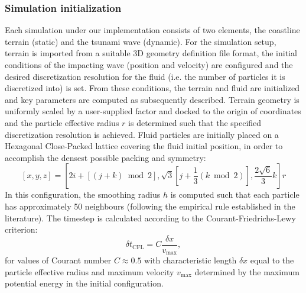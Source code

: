\documentclass{llncs}
\begin{document}
\subsubsection{Simulation initialization} Each simulation under our implementation
consists of two elements, the coastline terrain (static) and the tsunami wave
(dynamic). For the simulation setup, terrain is imported from a suitable 3D geometry
definition file format, the initial conditions of the impacting wave (position and
velocity) are configured and the desired discretization resolution for the fluid (i.e. the
number of particles it is discretized into) is set. From these conditions, the terrain and
fluid are initialized and key parameters are computed as subsequently described. Terrain
geometry is uniformly scaled by a user-supplied factor and docked to the origin of
coordinates and the particle effective radius $r$ is determined such that the specified
discretization resolution is achieved. Fluid particles are initially placed on a Hexagonal
Close-Packed lattice covering the fluid initial position, in order to accomplish the
densest possible packing and symmetry:
\begin{equation}
  \label{eq:hcp}
  [x, y, z] = \left[ 2i+[(j+k) \bmod 2], \sqrt{3}[j + \frac{1}{3} (k \bmod 2)],
    \frac{2\sqrt{6}}{3} k \right] r
\end{equation}
In this configuration, the smoothing radius $h$ is computed such that each particle has
approximately 50 neighbours (following the empirical rule established in the
literature). The timestep is calculated according to the Courant-Friedrichs-Lewy
criterion:
\begin{equation}
  \label{eq:cfl}
  \delta t_{\text{CFL}} = C \frac {\delta x}{v_{\text{max}}},
\end{equation}
for values of Courant number $C\approx0.5$ with characteristic length $\delta x$ equal to
the particle effective radius and maximum velocity $v_{\text{max}}$ determined by the
maximum potential energy in the initial configuration.
\end{document}
